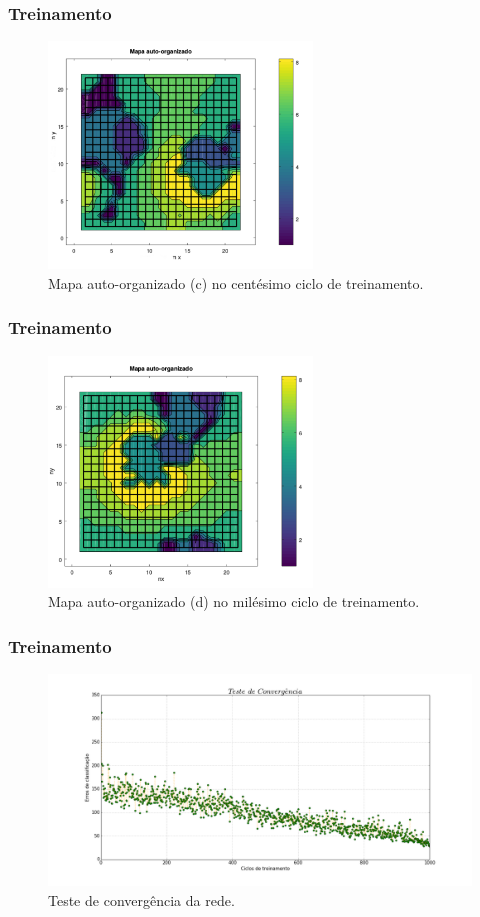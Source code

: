 \documentclass[aspectratio=10]{beamer} %
\begin{document}
\begin{frame}
\frametitle{Treinamento}
\begin{figure}
\centering
\includegraphics[width=7.0cm]{Imagens/SOM100_2d.pdf}
\caption{Mapa auto-organizado (c) no centésimo ciclo de treinamento.}
\end{figure}
\end{frame}

\begin{frame}
\frametitle{Treinamento}
\begin{figure}
\centering
\includegraphics[width=7.0cm]{Imagens/SOM1000_2d.pdf}
\caption{Mapa auto-organizado (d) no milésimo ciclo de treinamento.}
\label{SOMd}
\end{figure}
\end{frame}

\begin{frame}
\frametitle{Treinamento}
\begin{figure}[H]
\centering
\includegraphics[scale=0.2]{Imagens/conv070917.png}
\caption{Teste de convergência da rede.}
\label{convergencia}
\end{figure} 
\end{frame}
\end{document}
